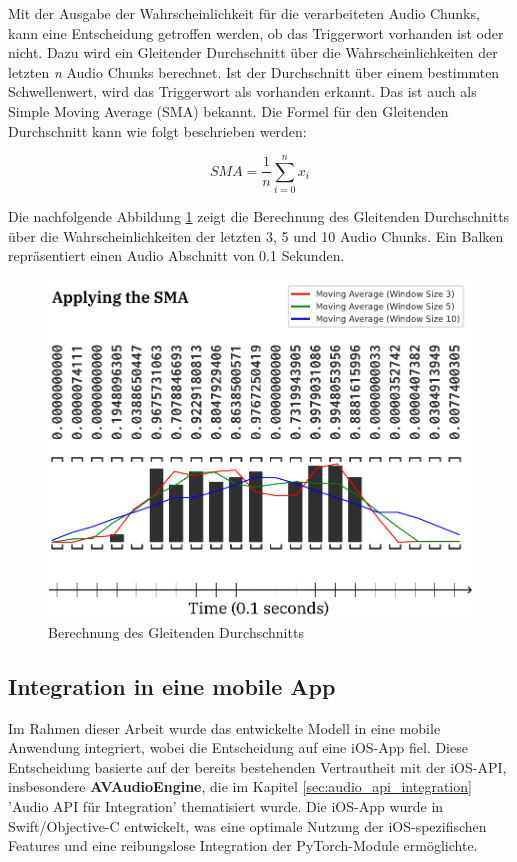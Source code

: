 \documentclass[11pt,a4paper]{article}
\begin{document}
\noindent
Mit der Ausgabe der Wahrscheinlichkeit für die verarbeiteten Audio Chunks, kann eine Entscheidung 
getroffen werden, ob das Triggerwort vorhanden ist oder nicht. Dazu wird ein Gleitender Durchschnitt 
über die Wahrscheinlichkeiten der letzten \textit{n} Audio Chunks berechnet. Ist der Durchschnitt 
über einem bestimmten Schwellenwert, wird das Triggerwort als vorhanden erkannt. Das ist auch als 
Simple Moving Average (SMA) bekannt. Die Formel für den Gleitenden Durchschnitt kann wie folgt 
beschrieben werden:

\noindent
\begin{equation*}
	SMA = \frac{1}{n} \sum_{i=0}^{n} x_{i}
\end{equation*}

\noindent
Die nachfolgende Abbildung \ref{fig:sma} zeigt die Berechnung des Gleitenden Durchschnitts über 
die Wahrscheinlichkeiten der letzten 3, 5 und 10 Audio Chunks. Ein Balken repräsentiert einen Audio 
Abschnitt von 0.1 Sekunden.

\begin{figure}[H]
	\centering
	\includegraphics[width=0.5\linewidth]{img/sma.pdf}
	\caption{Berechnung des Gleitenden Durchschnitts}
	\label{fig:sma}
\end{figure}


\subsection{Integration in eine mobile App}
Im Rahmen dieser Arbeit wurde das entwickelte Modell in eine mobile Anwendung integriert, wobei die 
Entscheidung auf eine iOS-App fiel. Diese Entscheidung basierte auf der bereits bestehenden 
Vertrautheit mit der iOS-API, insbesondere \textbf{AVAudioEngine}, die im Kapitel 
\ref{sec:audio_api_integration} 'Audio API für Integration' thematisiert wurde. Die iOS-App wurde in 
Swift/Objective-C entwickelt, was eine optimale Nutzung der iOS-spezifischen Features und eine 
reibungslose Integration der PyTorch-Module ermöglichte.
\end{document}
